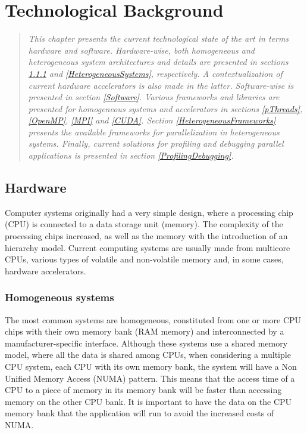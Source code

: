 \chapter{Technological Background}
\label{TechnologicalBackground}

\begin{quote}
\textit{This chapter presents the current technological state of the art in terms hardware and software. Hardware-wise, both homogeneous and heterogeneous system architectures and details are presented in sections \ref{HomogeneousSystems} and \ref{HeterogeneousSystems}, respectively. A contextualization of current hardware accelerators is also made in the latter. Software-wise is presented in section \ref{Software}. Various frameworks and libraries are presented for homogeneous systems and accelerators in sections \ref{pThreads}, \ref{OpenMP}, \ref{MPI} and \ref{CUDA}. Section \ref{HeterogeneousFrameworks} presents the available frameworks for parallelization in heterogeneous systems. Finally, current solutions for profiling and debugging parallel applications is presented in section \ref{ProfilingDebugging}.}
\end{quote}

\section{Hardware}
\label{Hardware}

Computer systems originally had a very simple design, where a processing chip (CPU) is connected to a data storage unit (memory). The complexity of the processing chips increased, as well as the memory with the introduction of an hierarchy model. Current computing systems are usually made from multicore CPUs, various types of volatile and non-volatile memory and, in some cases, hardware accelerators.

\subsection{Homogeneous systems}
\label{HomogeneousSystems}

The most common systems are homogeneous, constituted from one or more CPU chips with their own memory bank (RAM memory) and interconnected by a manufacturer-specific interface. Although these systems use a shared memory model, where all the data is shared among CPUs, when considering a multiple CPU system, each CPU with its own memory bank, the system will have a Non Unified Memory Access (NUMA) pattern. This means that the access time of a CPU to a piece of memory in its memory bank will be faster than accessing memory on the other CPU bank. It is important to have the data on the CPU memory bank that the application will run to avoid the increased costs of NUMA.


